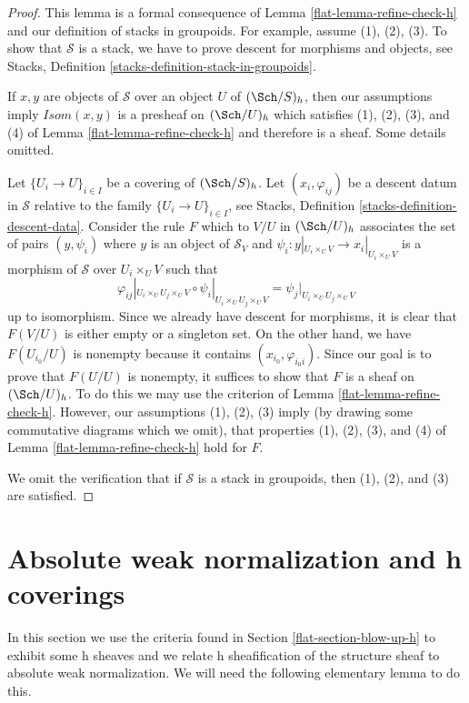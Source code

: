 \begin{proof}

This lemma is a formal consequence of Lemma \ref{flat-lemma-refine-check-h}
and our definition of stacks in groupoids.
For example, assume (1), (2), (3). To show that
$\mathcal{S}$ is a stack, we have
to prove descent for morphisms and objects, see
Stacks, Definition \ref{stacks-definition-stack-in-groupoids}.

\medskip\noindent
If $x, y$ are objects of $\mathcal{S}$ over an object $U$ of
$(\Sch/S)_h$, then our assumptions imply $\mathit{Isom}(x, y)$
is a presheaf on $(\Sch/U)_h$ which satisfies
(1), (2), (3), and (4) of Lemma \ref{flat-lemma-refine-check-h}
and therefore is a sheaf. Some details omitted.

\medskip\noindent
Let $\{U_i \to U\}_{i \in I}$ be a covering of $(\Sch/S)_h$.
Let $(x_i, \varphi_{ij})$ be a descent datum in $\mathcal{S}$
relative to the family $\{U_i \to U\}_{i \in I}$, see
Stacks, Definition \ref{stacks-definition-descent-data}.
Consider the rule $F$ which to $V/U$ in $(\Sch/U)_h$ associates
the set of pairs $(y, \psi_i)$ where $y$ is an object of $\mathcal{S}_V$
and $\psi_i : y|_{U_i \times_U V} \to x_i|_{U_i \times_U V}$
is a morphism of $\mathcal{S}$ over $U_i \times_U V$
such that
$$
\varphi_{ij}|_{U_i \times_U U_j \times_U V}
\circ
\psi_i|_{U_i \times_U U_j \times_U V}
=
\psi_j|_{U_i \times_U U_j \times_U V}
$$
up to isomorphism. Since we already have descent for morphisms, it is
clear that $F(V/U)$ is either empty or a singleton set. On the other hand,
we have $F(U_{i_0}/U)$ is nonempty because it contains
$(x_{i_0}, \varphi_{i_0i})$. Since our goal is to prove that $F(U/U)$
is nonempty, it suffices to show that $F$ is a sheaf on $(\Sch/U)_h$.
To do this we may use the criterion of Lemma \ref{flat-lemma-refine-check-h}.
However, our assumptions (1), (2), (3) imply (by drawing some
commutative diagrams which we omit), that properties (1), (2), (3), and (4)
of Lemma \ref{flat-lemma-refine-check-h} hold for $F$.

\medskip\noindent
We omit the verification that if $\mathcal{S}$ is a stack in groupoids,
then (1), (2), and (3) are satisfied.
\end{proof}

\section{Absolute weak normalization and h coverings}
\label{flat-section-h-and-weak-normalization}
In this section we use the criteria found in
Section \ref{flat-section-blow-up-h}
to exhibit some h sheaves and we relate h sheafification
of the structure sheaf to absolute weak normalization.
We will need the following elementary lemma to do this.

